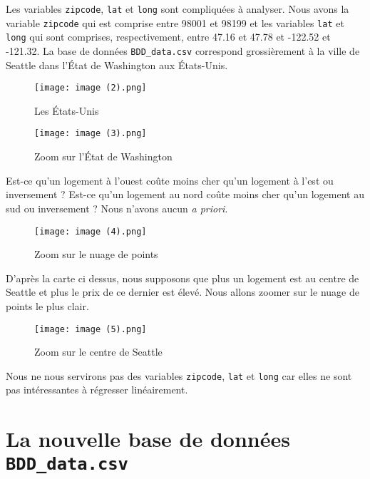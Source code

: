 \documentclass[
  11pt,
  french,
]{article}
\begin{document}
Les variables \texttt{zipcode}, \texttt{lat} et \texttt{long} sont
compliquées à analyser. Nous avons la variable \texttt{zipcode} qui est
comprise entre 98001 et 98199 et les variables \texttt{lat} et
\texttt{long} qui sont comprises, respectivement, entre 47.16 et 47.78
et -122.52 et -121.32. La base de données \texttt{BDD\_data.csv}
correspond grossièrement à la ville de Seattle dans l'État de Washington
aux États-Unis.

\begin{figure}
\centering
\texttt{[image: image (2).png]}
\caption{Les États-Unis}
\end{figure}

\begin{figure}
\centering
\texttt{[image: image (3).png]}
\caption{Zoom sur l'État de Washington}
\end{figure}

\newpage

Est-ce qu'un logement à l'ouest coûte moins cher qu'un logement à l'est
ou inversement ? Est-ce qu'un logement au nord coûte moins cher qu'un
logement au sud ou inversement ? Nous n'avons aucun \textit{a priori}.

\begin{figure}
\centering
\texttt{[image: image (4).png]}
\caption{Zoom sur le nuage de points}
\end{figure}

D'après la carte ci dessus, nous supposons que plus un logement est au
centre de Seattle et plus le prix de ce dernier est élevé. Nous allons
zoomer sur le nuage de points le plus clair.

\begin{figure}
\centering
\texttt{[image: image (5).png]}
\caption{Zoom sur le centre de Seattle}
\end{figure}

Nous ne nous servirons pas des variables \texttt{zipcode}, \texttt{lat}
et \texttt{long} car elles ne sont pas intéressantes à régresser
linéairement.

\newpage

\hypertarget{la-nouvelle-base-de-donnuxe9es-bdd_data.csv}{%
\section{\texorpdfstring{La nouvelle base de données
\texttt{BDD\_data.csv}}{La nouvelle base de données BDD\_data.csv}}\label{la-nouvelle-base-de-donnuxe9es-bdd_data.csv}}
\end{document}
